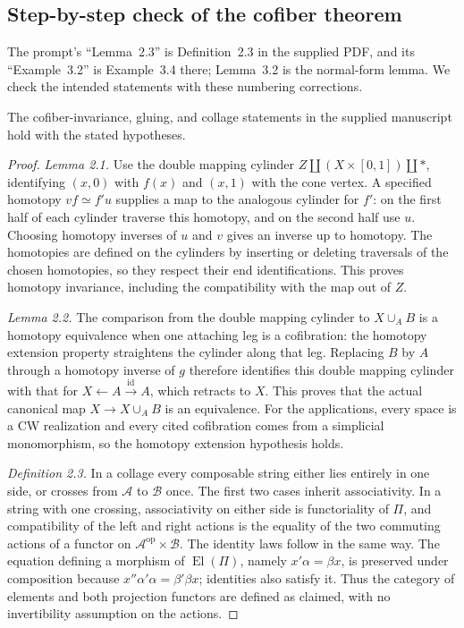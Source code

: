 \subsection{Step-by-step check of the cofiber theorem}
The prompt's ``Lemma~2.3'' is Definition~2.3 in the supplied PDF, and its
``Example~3.2'' is Example~3.4 there; Lemma~3.2 is the normal-form lemma.
We check the intended statements with these numbering corrections.

\begin{lemma}
\label{lem:B-elementary}
The cofiber-invariance, gluing, and collage statements in the supplied
manuscript hold with the stated hypotheses.
\end{lemma}
\begin{proof}
\emph{Lemma 2.1.}  Use the double mapping cylinder
$Z\amalg (X\times[0,1])\amalg *$, identifying $(x,0)$ with $f(x)$
and $(x,1)$ with the cone vertex.  A specified homotopy
$vf\simeq f'u$ supplies a map to the analogous cylinder for $f'$: on the
first half of each cylinder traverse this homotopy, and on the second
half use $u$.  Choosing homotopy inverses of $u$ and $v$ gives an inverse
up to homotopy.  The homotopies are defined on the cylinders by inserting
or deleting traversals of the chosen homotopies, so they respect their
end identifications.  This proves homotopy invariance, including the
compatibility with the map out of $Z$.

\emph{Lemma 2.2.}  The comparison from the double mapping cylinder to
$X\cup_A B$ is a homotopy equivalence when one attaching leg is a
cofibration: the homotopy extension property straightens the cylinder
along that leg.  Replacing $B$ by $A$ through a homotopy inverse of $g$
therefore identifies this double mapping cylinder with that for
$X\leftarrow A\xrightarrow{\mathrm{id}}A$, which retracts to $X$.
This proves that the actual canonical map $X\to X\cup_A B$ is an
equivalence.  For the applications, every space is a CW realization and
every cited cofibration comes from a simplicial monomorphism, so the
homotopy extension hypothesis holds.

\emph{Definition 2.3.}  In a collage every composable string either lies
entirely in one side, or crosses from $\mathcal A$ to $\mathcal B$ once.
The first two cases inherit associativity.  In a string with one crossing,
associativity on either side is functoriality of $\Pi$, and compatibility
of the left and right actions is the equality of the two commuting
actions of a functor on $\mathcal A^{\mathrm{op}}\times\mathcal B$.
The identity laws follow in the same way.  The equation defining a
morphism of $\operatorname{El}(\Pi)$, namely
$x'\alpha=\beta x$, is preserved under composition because
$x''\alpha'\alpha=\beta'\beta x$; identities also satisfy it.
Thus the category of elements and both projection functors are defined
as claimed, with no invertibility assumption on the actions.
\end{proof}

